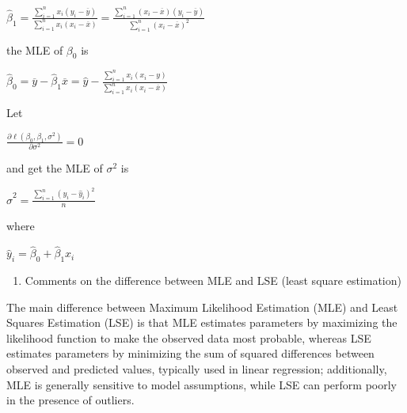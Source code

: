\documentclass[11pt]{article}
\makeatletter
\providecommand{\tightlist}{%
      \setlength{\itemsep}{0pt}\setlength{\parskip}{0pt}}
\newcommand{\boxspacing}{\kern\kvtcb@left@rule\kern\kvtcb@boxsep}
\newcommand{\prompt}[4]{
        {\ttfamily\llap{{\color{#2}[#3]:\hspace{3pt}#4}}\vspace{-\baselineskip}}
    }
\makeatother
\begin{document}
\(\hat{\beta}_1 = \frac{\sum_{i=1}^n x_i (y_i - \overline{y})}{\sum_{i=1}^n x_i (x_i - \overline{x})} = \frac{\sum_{i=1}^n (x_i - \overline{x})(y_i - \overline{y})}{\sum_{i=1}^n (x_i - \overline{x})^2}\)

the MLE of \(\beta_0\) is

\(\hat{\beta}_0 = \overline{y} - \hat{\beta}_1 \overline{x} = \hat{y} - \frac{\sum_{i=1}^n x_i (x_i - y)}{\sum_{i=1}^n x_i (x_i - \overline{x})}\)

Let

\(\frac{\partial \ell(\beta_0, \beta_1, \sigma^2)}{\partial \sigma^2} = 0\)

and get the MLE of \(\sigma^2\) is

\(\hat{\sigma}^2 = \frac{\sum_{i=1}^n (y_i - \hat{y}_i)^2}{n}\)

where

\(\hat{y}_i = \hat{\beta}_0 + \hat{\beta}_1 x_i\)

    \begin{enumerate}
\def\labelenumi{(\alph{enumi})}
\setcounter{enumi}{1}
\tightlist
\item
  Comments on the difference between MLE and LSE (least square
  estimation)
\end{enumerate}

    The main difference between Maximum Likelihood Estimation (MLE) and
Least Squares Estimation (LSE) is that MLE estimates parameters by
maximizing the likelihood function to make the observed data most
probable, whereas LSE estimates parameters by minimizing the sum of
squared differences between observed and predicted values, typically
used in linear regression; additionally, MLE is generally sensitive to
model assumptions, while LSE can perform poorly in the presence of
outliers.

    \begin{tcolorbox}[breakable, size=fbox, boxrule=1pt, pad at break*=1mm,colback=cellbackground, colframe=cellborder]
\prompt{In}{incolor}{ }{\boxspacing}
\begin{Verbatim}[commandchars=\\\{\}]

\end{Verbatim}
\end{tcolorbox}


    
    
    
\end{document}
